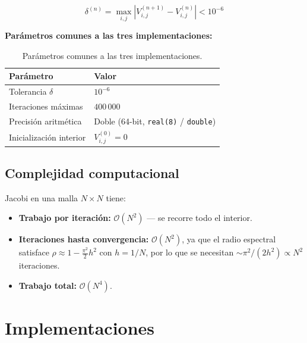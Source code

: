 \documentclass[12pt, a4paper]{article}
\begin{document}
\begin{equation}
  \delta^{(n)} = \max_{i,j}\left|V_{i,j}^{(n+1)} - V_{i,j}^{(n)}\right| < 10^{-6}
  \label{eq:criterio}
\end{equation}

\textbf{Parámetros comunes a las tres implementaciones:}

\begin{table}[H]
  \centering
  \begin{tabular}{ll}
    \toprule
    \textbf{Parámetro} & \textbf{Valor} \\
    \midrule
    Tolerancia $\delta$ & $10^{-6}$ \\
    Iteraciones máximas & $400\,000$ \\
    Precisión aritmética & Doble (64-bit, \texttt{real(8)} / \texttt{double}) \\
    Inicialización interior & $V_{i,j}^{(0)} = 0$ \\
    \bottomrule
  \end{tabular}
  \caption{Parámetros comunes a las tres implementaciones.}
  \label{tab:params}
\end{table}

\subsection{Complejidad computacional}

Jacobi en una malla $N\times N$ tiene:
\begin{itemize}[noitemsep]
  \item \textbf{Trabajo por iteración:} $\mathcal{O}(N^2)$ — se recorre todo el interior.
  \item \textbf{Iteraciones hasta convergencia:} $\mathcal{O}(N^2)$, ya que el radio
        espectral satisface $\rho \approx 1 - \tfrac{\pi^2}{2}h^2$ con $h=1/N$,
        por lo que se necesitan $\sim \pi^2/(2h^2) \propto N^2$ iteraciones.
  \item \textbf{Trabajo total:} $\mathcal{O}(N^4)$.
\end{itemize}

\section{Implementaciones}
\end{document}
